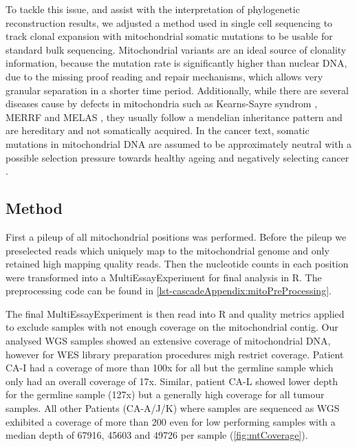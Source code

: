 To tackle this issue, and assist with the interpretation of phylogenetic reconstruction results, we adjusted a method used in single cell sequencing to track clonal expansion with mitochondrial somatic mutations \cite{Ludwig2019} to be usable for standard bulk sequencing. Mitochondrial variants are an ideal source of clonality information, because the mutation rate is significantly higher than nuclear DNA, due to the missing proof reading and repair mechanisms, which allows very granular separation in a shorter time period. Additionally, while there are several diseases cause by defects in mitochondria such as Kearns-Sayre syndrom \cite{Harvey1992}, MERRF \cite{Adam1993} and MELAS \cite{Hirano1992}, they usually follow a mendelian inheritance pattern and are hereditary and not somatically acquired. In the cancer text, somatic mutations in mitochondrial DNA are assumed to be approximately neutral with a possible selection pressure towards healthy ageing and negatively selecting cancer \cite{Rodell2013,Yuan2020}.

\subsection{Method}
\label{cascade-sec:mitoMethod}

First a pileup of all mitochondrial positions was performed. Before the pileup we preselected reads which uniquely map to the mitochondrial genome and only retained high mapping quality reads. Then the nucleotide counts in each position were transformed into a MultiEssayExperiment \cite{Ramos2017} for final analysis in R. The preprocessing code can be found in \autoref{lst-cascadeAppendix:mitoPreProcessing}.

The final MultiEssayExperiment is then read into R and quality metrics applied to exclude samples with not enough coverage on the mitochondrial contig. Our analysed WGS samples showed an extensive coverage of mitochondrial DNA, however for WES library preparation procedures migh restrict coverage. Patient CA-I had a coverage of more than 100x for all but the germline sample which only had an overall coverage of 17x. Similar, patient CA-L showed lower depth for the germline sample (127x) but a generally high coverage for all tumour samples. All other Patients (CA-A/J/K) where samples are sequenced as WGS exhibited a coverage of more than 200 even for low performing samples with a median depth of \num{67916}, \num{45603} and \num{49726} per sample (\autoref{fig:mtCoverage}).

